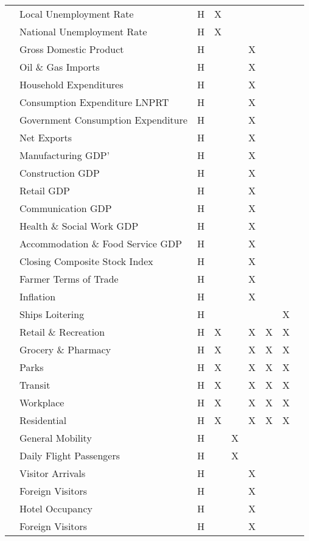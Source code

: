\begin{center}
\begin{longtable}{|C{1.5cm}|C{2.5cm}|C{0.75cm}|C{1cm}|C{1cm}|C{2cm}|C{1.5cm}|C{1.5cm}|C{1cm}|}
 & Local Unemployment Rate & H & X & & & & \\* 
& National Unemployment Rate & H & X & & & & \\* 
& Gross Domestic Product & H & & & X & & \\* 
& Oil \& Gas Imports & H & & & X & & \\* 
& Household Expenditures & H & & & X & & \\* 
& Consumption Expenditure LNPRT & H & & & X & & \\* 
& Government Consumption Expenditure & H & & & X & & \\* 
& Net Exports & H & & & X & & \\* 
& Manufacturing GDP' & H & & & X & & \\* 
& Construction GDP & H & & & X & & \\* 
& Retail GDP & H & & & X & & \\* 
& Communication GDP & H & & & X & & \\* 
& Health \& Social Work GDP & H & & & X & & \\* 
& Accommodation \& Food Service GDP & H & & & X & & \\* 
& Closing Composite Stock Index & H & & & X & & \\* 
& Farmer Terms of Trade & H & & & X & & \\* 
& Inflation & H & & & X & & \\* 
& Ships Loitering & H & & & & & X \\ \hline

 & Retail \& Recreation & H & X  & & X & X & X \\* 
& Grocery \& Pharmacy & H & X & & X & X & X\\* 
& Parks & H & X  & & X & X & X\\* 
& Transit & H & X  & & X & X & X \\* 
& Workplace & H & X  & & X & X & X\\* 
& Residential & H & X  & & X & X & X\\* 
& General Mobility & H & & X & & & \\* 
& Daily Flight Passengers & H & & X & & & \\* 
& Visitor Arrivals & H & & & X & & \\* 
& Foreign Visitors & H & & & X & & \\* 
& Hotel Occupancy & H & & & X & & \\* 
& Foreign Visitors & H & & & X & & \\ \hline

\end{longtable}
\end{center}
